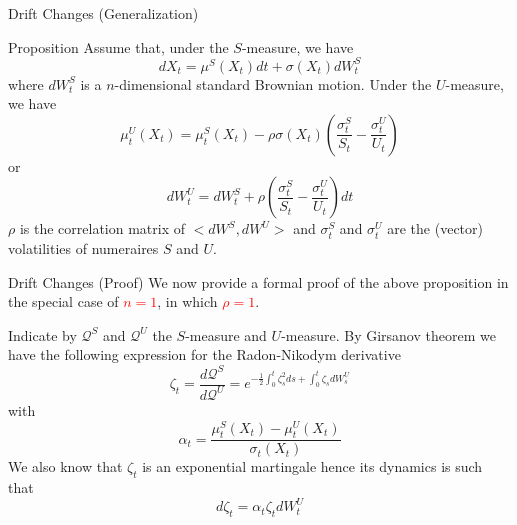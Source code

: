 \documentclass{beamer}
\begin{document}
\begin{frame}{Drift Changes (Generalization)}
	\begin{block}{Proposition}
	Assume that, under the $S$-measure, we have
	\begin{equation*}
	dX_t = \mu^S(X_t)dt + \sigma(X_t)dW^S_t
	\end{equation*}
	where $dW^S_t$ is a $n$-dimensional standard Brownian motion. Under the $U$-measure, we have
	\begin{equation}
	\mu^U_t(X_t) = \mu^S_t(X_t) - \rho\sigma(X_t)\left(\frac{\sigma^S_t}{S_t}-\frac{\sigma^U_t}{U_t}\right)
	\end{equation}
	or
	\begin{equation}
	dW^U_t = dW^S_t + \rho\left(\frac{\sigma^S_t}{S_t}-\frac{\sigma^U_t}{U_t}\right) dt
	\end{equation}
	$\rho$ is the correlation matrix of $<dW^S,dW^U>$ and $\sigma^S_t$ and $\sigma^U_t$ are the (vector) volatilities of numeraires $S$ and $U$. %
	\end{block}
\end{frame}

\begin{frame}{Drift Changes (Proof)}
	We now provide a formal proof of the above proposition in the special case of \textcolor{red}{$n=1$}, in which \textcolor{red}{$\rho=1$}.
	
	Indicate by $\mathcal{Q}^S$ and $\mathcal{Q}^U$ the $S$-measure and $U$-measure. By Girsanov theorem we have the following expression for the Radon-Nikodym derivative
	\begin{equation*}
	\zeta_t = \frac{d\mathcal{Q}^S}{d\mathcal{Q}^U} = e^{-\frac{1}{2}\int_0^t\zeta_s^2 ds + \int_0^t\zeta_s dW_s^U}
	\end{equation*}
	with 
	\begin{equation*}
	\alpha_t=\frac{\mu^S_t(X_t)-\mu_t^U(X_t)}{\sigma_t(X_t)}
	\end{equation*}
	We also know that $\zeta_t$ is an exponential martingale hence its dynamics is such that 
	\begin{equation}
	d\zeta_t=\alpha_t\zeta_tdW_t^U
	\label{eq:dzeta1}
	\end{equation}
\end{frame}
\end{document}
